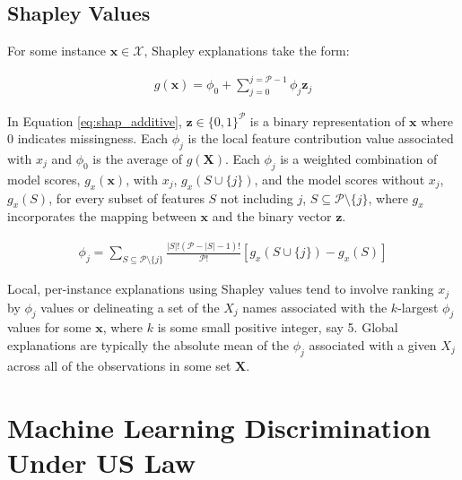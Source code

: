 \documentclass[information,article,submit,moreauthors,pdftex]{definitions/mdpi}
\begin{document}
\subsection{Shapley Values}\label{a_ssec:shap}

For some instance $\mathbf{x} \in \mathcal{X}$, Shapley explanations take the form: 

\begin{equation}
\label{eq:shap_additive}
\begin{aligned}
g(\mathbf{x}) = \phi_0 + \sum_{j=0}^{j=\mathcal{P} - 1} \phi_j \mathbf{z}_j
\end{aligned}
\end{equation}

\noindent In Equation \ref{eq:shap_additive}, $\mathbf{z} \in \{0,1\}^\mathcal{P}$ is a binary representation of $\mathbf{x}$ where 0 indicates missingness. Each $\phi_j$ is the local feature contribution value associated with $x_j$ and $\phi_0$ is the average of $g(\mathbf{X})$. Each $\phi_j$ is a weighted combination of model scores, $g_x(\mathbf{x})$, with $x_j$, $g_x(S \cup \{j\})$, and the model scores without $x_j$, $g_x(S)$, for every subset of features $S$ not including $j$, $S \subseteq \mathcal{P} \setminus \{j\}$, where $g_x$ incorporates the mapping between $\mathbf{x}$ and the binary vector $\mathbf{z}$. 

\begin{equation}
\label{eq:shap_contrib}
\begin{aligned}
\phi_{j} = \sum_{S \subseteq \mathcal{P} \setminus \{j\}}\frac{|S|!(\mathcal{P} -|S| -1)!}{\mathcal{P}!}[g_x(S \cup \{j\}) - g_x(S)]
\end{aligned}
\end{equation}

\noindent Local, per-instance explanations using Shapley values tend to involve ranking $x_j$ by $\phi_j$ values or delineating a set of the $X_j$ names associated with the $k$-largest $\phi_j$ values for some $\mathbf{x}$, where $k$ is some small positive integer, say 5. Global explanations are typically the absolute mean of the $\phi_j$ associated with a given $X_j$ across all of the observations in some set $\mathbf{X}$.

\section{Machine Learning Discrimination Under US Law}\label{a_sec:types}
\end{document}
